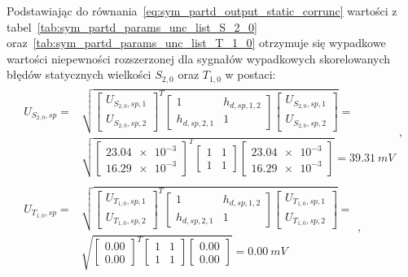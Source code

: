 Podstawiając do równania~\eqref{eq:sym_partd_output_static_corrunc} wartości z tabel~\ref{tab:sym_partd_params_unc_list_S_2_0} oraz~\ref{tab:sym_partd_params_unc_list_T_1_0} otrzymuje się wypadkowe wartości niepewności rozszerzonej dla sygnałów wypadkowych skorelowanych błędów statycznych wielkości $S_{2,0}$ oraz $T_{1,0}$ w postaci:
\begin{gather}
\begin{split}
U_{S_{2,0},sp} = & \sqrt{
\begin{bmatrix}
U_{S_{2,0},sp,1} \\ U_{S_{2,0},sp,2}
\end{bmatrix}^{T}
\begin{bmatrix}
1 & h_{d,sp,1,2} \\
h_{d,sp,2,1} & 1
\end{bmatrix}
\begin{bmatrix}
U_{S_{2,0},sp,1} \\ U_{S_{2,0},sp,2}
\end{bmatrix}} = \\ & \sqrt{
\begin{bmatrix}
\num{23.04e-3} \\ \num{16.29e-3}
\end{bmatrix}^{T}
\begin{bmatrix}
1 & 1 \\
1 & 1
\end{bmatrix}
\begin{bmatrix}
\num{23.04e-3} \\ \num{16.29e-3}
\end{bmatrix}} = \qty{39.31}{mV}
\end{split}
\label{eq:sym_partd_output_static_corrunc_S_2_0}, \\
\begin{split}
U_{T_{1,0},sp} = & \sqrt{
\begin{bmatrix}
U_{T_{1,0},sp,1} \\ U_{T_{1,0},sp,2}
\end{bmatrix}^{T}
\begin{bmatrix}
1 & h_{d,sp,1,2} \\
h_{d,sp,2,1} & 1
\end{bmatrix}
\begin{bmatrix}
U_{T_{1,0},sp,1} \\ U_{T_{1,0},sp,2}
\end{bmatrix}} = \\ & \sqrt{
\begin{bmatrix}
0.00 \\ 0.00
\end{bmatrix}^{T}
\begin{bmatrix}
1 & 1 \\
1 & 1
\end{bmatrix}
\begin{bmatrix}
0.00 \\ 0.00
\end{bmatrix}} = \qty{0.00}{mV}
\end{split}
\label{eq:sym_partd_output_static_corrunc__T_1_0},
\end{gather}
